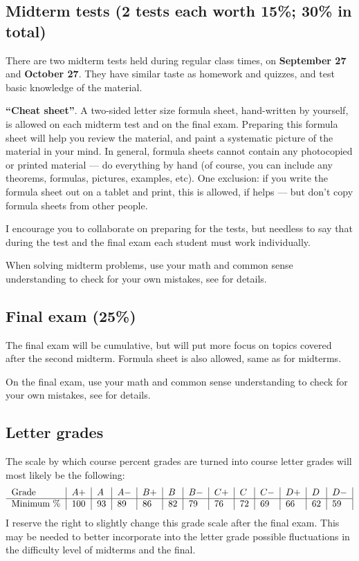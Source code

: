 \documentclass[oneside,11pt]{amsart}
\begin{document}
\subsection{Midterm tests (2 tests each worth 15\%; 30\% in total)}

There are two midterm tests
held
during regular class times, on \textbf{September 27} and \textbf{October 27}.
They have
similar taste as homework and quizzes, and test basic knowledge of the material.

\textbf{``Cheat sheet''}.
A two-sided letter size formula sheet, hand-written by yourself, is
allowed on each midterm test and on the final exam. Preparing this formula sheet
will help you review the material, and paint a systematic picture of the material in your mind.
In general, formula sheets cannot contain any photocopied or
printed material --- do everything by hand (of course, you can
include any theorems, formulas, pictures, examples, etc).
One exclusion: if you write the formula sheet out on a
tablet and print, this is allowed, if helps --- but don't copy
formula sheets from other people.

I encourage you to collaborate on preparing for the tests, but needless to say that
during the test and the final exam each student must work individually.

When solving midterm problems, use your math and common sense understanding to check for your own mistakes,
see  for details.


\subsection{Final exam (25\%)}

The final exam will be cumulative, but will put more focus 
on topics covered after the second midterm.
Formula sheet is also allowed, same as for midterms.

On the final exam, use your math and common sense understanding to check for your own mistakes,
see  for details.


\subsection*{Letter grades}

The scale by which course percent grades are turned into course letter grades
will most likely be the following:
\begin{equation*}
	\begin{tabular}{l|l|l|l|l|l|l|l|l|l|l|l|l|}
		Grade      & $ A+	$ & $A	$ & $A-	$ & $B+	$ & $B	$ & $B-	$ & $C+	$ & $C	$ & $C-	$ & $D+	$ & $D	$ & $D-$ \\
		\hline
		Minimum \% & 100     & 93   & 89    & 86    & 82    & 79    & 76    & 72    & 69    & 66    & 62    & 59
	\end{tabular}
\end{equation*}
I reserve the right to slightly change this grade scale after the
final exam.
This may be needed
to better incorporate into the letter grade
possible fluctuations in the difficulty level of 
midterms and the final.
\end{document}
